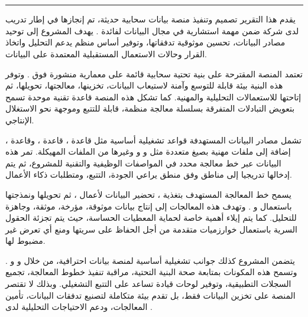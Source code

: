 \chapter*{}

\begin{center}
{\color{softline}\rule{0.42\textwidth}{0.7pt}}
\end{center}

\vspace{0.08cm}

\enlargethispage{5\baselineskip}
\footnotesize
\setlength{\parindent}{0pt}
\setlength{\parskip}{0.18em}
\linespread{0.94}\selectfont
\begin{arabtext}
يقدم هذا التقرير تصميم وتنفيذ منصة بيانات سحابية حديثة، تم إنجازها في إطار تدريب لدى شركة  ضمن مهمة استشارية في مجال البيانات لفائدة . يهدف المشروع إلى توحيد مصادر البيانات، تحسين موثوقية تدفقاتها، وتوفير أساس منظم يدعم التحليل واتخاذ القرار وحالات الاستعمال المستقبلية المعتمدة على البيانات.

تعتمد المنصة المقترحة على بنية تحتية سحابية قائمة على معمارية  منشورة فوق . وتوفر هذه البنية بيئة قابلة للتوسع وآمنة لاستيعاب البيانات، تخزينها، معالجتها، تحويلها، ثم إتاحتها للاستعمالات التحليلية والمهنية. كما تشكل هذه المنصة قاعدة تقنية موحدة تسمح بتعويض التبادلات المتفرقة بسلسلة معالجة منظمة، قابلة للتتبع وموجهة نحو الاستغلال الإنتاجي.

تشمل مصادر البيانات المستهدفة قواعد تشغيلية أساسية مثل قاعدة ، قاعدة ، وقاعدة ، إضافة إلى ملفات مهنية بصيغ متعددة مثل  و  و  وغيرها من الملفات المهيكلة. تمر هذه البيانات عبر خط معالجة محدد في المواصفات الوظيفية والتقنية للمشروع، ثم يتم إدخالها تدريجيا إلى مناطق  وفق منطق يراعي الجودة، التتبع، ومتطلبات ذكاء الأعمال.

يسمح خط المعالجة المستهدف بتغذية ، تحضير البيانات لأعمال ، ثم تحويلها ونمذجتها باستعمال  و . وتهدف هذه المعالجات إلى إنتاج بيانات موثوقة، مؤرخة، موثقة، وجاهزة للتحليل. كما يتم إيلاء أهمية خاصة لحماية المعطيات الحساسة، حيث يتم تجزئة الحقول السرية باستعمال خوارزميات متقدمة من أجل الحفاظ على سريتها ومنع أي تعرض غير مضبوط لها.

يتضمن المشروع كذلك جوانب تشغيلية أساسية لمنصة بيانات احترافية، من خلال  و  و . وتسمح هذه المكونات بمتابعة صحة البنية التحتية، مراقبة تنفيذ خطوط المعالجة، تجميع السجلات التطبيقية، وتوفير لوحات قيادة تساعد على التتبع التشغيلي. وبذلك لا تقتصر المنصة على تخزين البيانات فقط، بل تقدم بيئة متكاملة لتصنيع تدفقات البيانات، تأمين المعالجات، ودعم الاحتياجات التحليلية لدى .
\end{arabtext}

